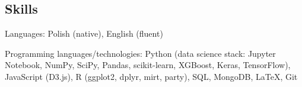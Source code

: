 \documentclass[margin,line]{resume}
\begin{document}
\begin{resume}

    \section{\mysidestyle Skills}
    \begin{list2}
        \item Languages: Polish (native), English (fluent)
        \item Programming languages/technologies: Python (data science stack: Jupyter Notebook, NumPy, SciPy, Pandas, scikit-learn, XGBoost, Keras, TensorFlow), JavaScript (D3.js), R (ggplot2, dplyr, mirt, party), SQL, MongoDB, LaTeX, Git
    \end{list2}

\end{resume}
\end{document}
